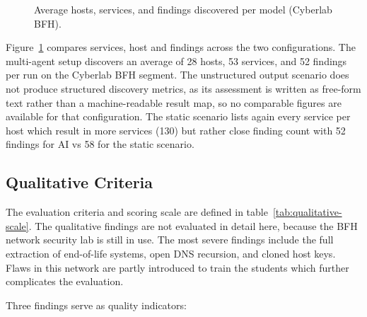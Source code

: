 \begin{figure}[H]
    \centering
    
    \caption{Average hosts, services, and findings discovered per model (Cyberlab BFH).}
    \label{fig:benchmark_services_cyberlab}
\end{figure}

Figure~\ref{fig:benchmark_services_cyberlab} compares services, host and findings across the two
configurations.
The multi-agent setup discovers an average of 28 hosts, 53 services, and 52 findings per
run on the Cyberlab BFH segment.
The unstructured output scenario does not produce structured discovery metrics, as its
assessment is written as free-form text rather than a machine-readable result map, so no
comparable figures are available for that configuration.
The static scenario lists again every service per host which result in more services (130) but rather close finding count with
52 findings for \gls{AI} vs 58 for the static scenario.

\subsection{Qualitative Criteria}\label{subsec:qualitativ-criteria-cyberlab}

The evaluation criteria and scoring scale are defined in table~\ref{tab:qualitative-scale}.
The qualitative findings are not evaluated in detail here, because the BFH network security lab is still in use.
The most severe findings include the full extraction of end-of-life systems, open \gls{DNS} recursion, and cloned host keys.
Flaws in this network are partly introduced to train the students which further complicates the evaluation.

Three findings serve as quality indicators:

